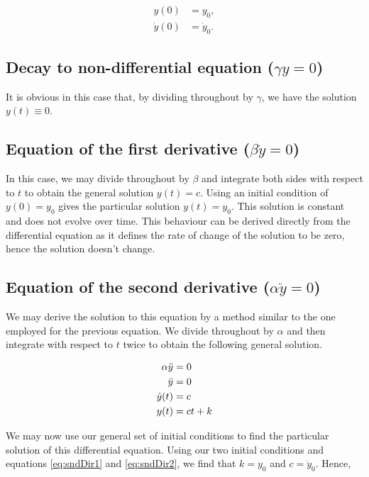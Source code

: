 \documentclass{article}
\begin{document}
\begin{align*}
	y(0) &= y_0, \\
	\dot{y}(0) &= \dot{y}_0.
\end{align*}

\subsection{Decay to non-differential equation ($\gamma y = 0$)}
\label{Bexception1}

It is obvious in this case that, by dividing throughout by $\gamma$, we have the solution $y(t) \equiv 0$.

\subsection{Equation of the first derivative ($\beta\dot{y} = 0$)}
\label{Bexception2}

In this case, we may divide throughout by $\beta$ and integrate both sides with respect to $t$ to obtain the general solution $y(t) = c$. Using an initial condition of $y(0) = y_0$ gives the particular solution $y(t) = y_0$.
This solution is constant and does not evolve over time. This behaviour can be derived directly from the differential equation as it defines the rate of change of the solution to be zero, hence the solution doesn't change.

\subsection{Equation of the second derivative ($\alpha\ddot{y} = 0$)}

We may derive the solution to this equation by a method similar to the one employed for the previous equation. We divide throughout by $\alpha$ and then integrate with respect to $t$ twice to obtain the following general solution.

\begin{align}
	\alpha\ddot{y} &= 0 \notag \\
	\ddot{y} &= 0 \notag \\
	\dot{y}(t) &= c \label{eq:sndDir1} \\
	y(t) &= ct + k \label{eq:sndDir2}
\end{align}

We may now use our general set of initial conditions to find the particular solution of this differential equation. Using our two initial conditions and equations \eqref{eq:sndDir1} and \eqref{eq:sndDir2}, we find that $k = y_0$ and $c = \dot{y}_0$. Hence,
\end{document}
